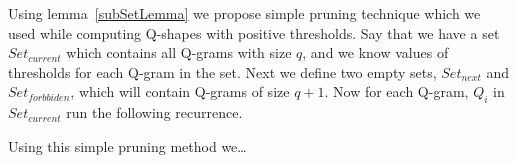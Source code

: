 \documentclass[paper=a4, fontsize=11pt]{scrartcl} %
\numberwithin{equation}{section} %
\numberwithin{figure}{section} %
\numberwithin{table}{section} %
\begin{document}
Using lemma~\ref{subSetLemma} we propose simple pruning technique which we used while computing Q-shapes with positive thresholds.
Say that we have a set $Set_{current}$ which contains all Q-grams with size $q$, and we know values of thresholds for each Q-gram in the set. Next we define two empty sets, $Set_{next}$ and $Set_{forbbiden}$, which will contain Q-grams of size $q+1$. Now for each Q-gram, $Q_{i}$ in $Set_{current}$ run the following recurrence.

 \begin{algorithmic}
     \ENDFOR
 \end{algorithmic}

Using this simple pruning method we\dots


\end{document}
